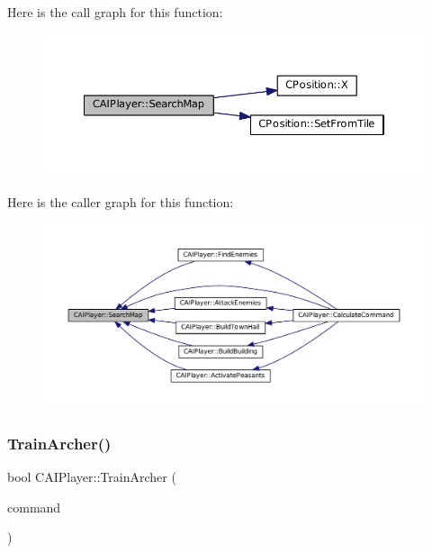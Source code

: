 Here is the call graph for this function\+:\nopagebreak
\begin{figure}[H]
\begin{center}
\leavevmode
\includegraphics[width=350pt]{classCAIPlayer_afafbe8fc589e09a16ae1f02f2794d7b0_cgraph}
\end{center}
\end{figure}
Here is the caller graph for this function\+:\nopagebreak
\begin{figure}[H]
\begin{center}
\leavevmode
\includegraphics[width=350pt]{classCAIPlayer_afafbe8fc589e09a16ae1f02f2794d7b0_icgraph}
\end{center}
\end{figure}
\hypertarget{classCAIPlayer_af2edf1e3c54d6af693f768f86d484fd6}{}\label{classCAIPlayer_af2edf1e3c54d6af693f768f86d484fd6} 
\subsubsection{\texorpdfstring{Train\+Archer()}{TrainArcher()}}
{\footnotesize\ttfamily bool C\+A\+I\+Player\+::\+Train\+Archer (\begin{DoxyParamCaption}\item[{\hyperlink{structSPlayerCommandRequest}{S\+Player\+Command\+Request} \&}]{command }\end{DoxyParamCaption})\hspace{0.3cm}{\ttfamily [protected]}}



